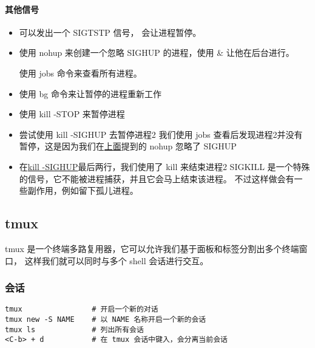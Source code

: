         \paragraph{其他信号}
            \begin{itemize}
                \item <C-z> 可以发出一个 SIGTSTP 信号， 会让进程暂停。

                \item 使用 nohup 来创建一个忽略 SIGHUP 的进程，使用 \& 让他在后台进行。

                使用 jobs 命令来查看所有进程。

                \item 使用 bg 命令来让暂停的进程重新工作

                \item 使用 kill -STOP 来暂停进程

                \item 尝试使用 kill -SIGHUP 去暂停进程2
                我们使用 jobs 查看后发现进程2并没有暂停，这是因为我们在\hyperref[par:暂停]{上面}提到的
                nohup 忽略了 SIGHUP

                \item 在\hyperref[fig:./ml/5.png]{kill -SIGHUP}最后两行，我们使用了 kill 来结束进程2
                SIGKILL 是一个特殊的信号，它不能被进程捕获，并且它会马上结束该进程。
                不过这样做会有一些副作用，例如留下孤儿进程。
            \end{itemize}

\subsection{tmux}\label{subsec:tmux}

    tmux 是一个终端多路复用器，它可以允许我们基于面板和标签分割出多个终端窗口，
    这样我们就可以同时与多个 shell 会话进行交互。

    \subsubsection{会话}
        \begin{verbatim}
tmux                # 开启一个新的对话
tmux new -S NAME    # 以 NAME 名称开启一个新的会话
tmux ls             # 列出所有会话
<C-b> + d           # 在 tmux 会话中键入，会分离当前会话
        \end{verbatim}

